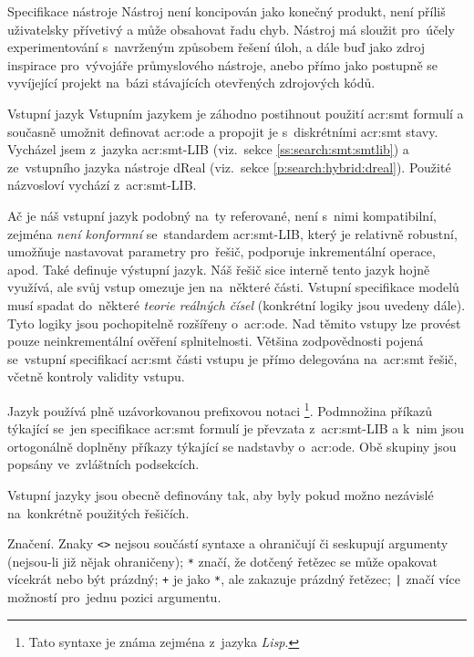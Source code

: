 \documentclass[thesis=M,czech]{FITthesis}[2012/06/26]
\newcommand{\acrlabel}[1]{acr:#1}
\newcommand{\acr}[1]{\acrshort{\acrlabel{#1}}}
\newcommand{\id}[1]{\texttt{#1}}
\newcommand{\hl}[1]{\textit{#1}}
\newcommand{\name}[1]{\hl{#1}}
\newcommand{\rf}[1]{\ref{#1}}
\begin{document}
\begin{section}{Specifikace nástroje}
Nástroj není koncipován jako konečný produkt,
není příliš uživatelsky přívetivý
a může obsahovat řadu chyb.
Nástroj má sloužit pro~účely experimentování
s~navrženým způsobem řešení úloh,
a dále buď jako zdroj inspirace
pro~vývojáře průmyslového nástroje,
anebo přímo jako postupně se vyvíjející projekt
na~bázi stávajících otevřených zdrojových kódů.


\begin{subsection}{Vstupní jazyk}\label{ss:design:spec:ilang}
Vstupním jazykem je záhodno postihnout
použití \acr{smt} formulí
a současně umožnit definovat \acr{ode}
a propojit je s~diskrétními \acr{smt} stavy.
Vycházel jsem z~jazyka \acr{smt}-LIB
(viz.~sekce \rf{ss:search:smt:smtlib})
a ze~vstupního jazyka nástroje dReal
(viz.~sekce \rf{p:search:hybrid:dreal}).
Použité názvosloví vychází z~\acr{smt}-LIB.

Ač je náš vstupní jazyk podobný na~ty referované,
není s~nimi kompatibilní,
zejména \hl{není konformní} se~standardem \acr{smt}-LIB,
který je relativně robustní,
umožňuje nastavovat parametry pro~řešič,
podporuje inkrementální operace, apod.
Také definuje výstupní jazyk.
Náš řešič sice interně tento jazyk hojně využívá,
ale svůj vstup omezuje jen na~některé části.
Vstupní specifikace modelů musí
spadat do~některé \hl{teorie reálných čísel}
(konkrétní logiky jsou uvedeny dále).
Tyto logiky jsou pochopitelně rozšířeny o~\acr{ode}.
Nad těmito vstupy lze provést pouze neinkrementální ověření splnitelnosti.
Většina zodpovědnosti pojená se~vstupní specifikací
\acr{smt} části vstupu je přímo delegována
na~\acr{smt} řešič, včetně kontroly validity vstupu.

Jazyk používá plně uzávorkovanou prefixovou notaci%
\footnote{Tato syntaxe je známa zejména z~jazyka \name{Lisp}.}.
Podmnožina příkazů týkající se~jen specifikace \acr{smt} formulí
je převzata z~\acr{smt}-LIB
a k~nim jsou ortogonálně doplněny
příkazy týkající se nadstavby o~\acr{ode}.
Obě skupiny jsou popsány ve~zvláštních podsekcích.

Vstupní jazyky jsou obecně definovány tak,
aby byly pokud možno nezávislé na~konkrétně použitých řešičích.


\begin{paragraph}{Značení.}\label{ss:design:spec:ilang:sign}
Znaky \id{<>} nejsou součástí syntaxe a ohraničují či seskupují argumenty
(nejsou-li již nějak ohraničeny);
\id{*} značí, že dotčený řetězec
se může opakovat vícekrát nebo být prázdný;
\id{+} je jako \id{*}, ale zakazuje prázdný řetězec;
\id{|} značí více možností pro~jednu pozici argumentu.
\end{paragraph} %


\end{subsection}
\end{section}
\end{document}
